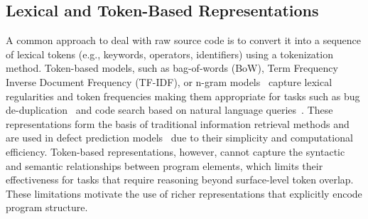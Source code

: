 \documentclass[\main/thesis.tex]{subfiles}
\begin{document}



\subsection{Lexical and Token-Based Representations}
A common approach to deal with raw source code is to convert it into a sequence of lexical tokens (e.g., keywords, operators, identifiers) using a tokenization method. Token-based models, such as bag-of-words (BoW), Term Frequency Inverse Document Frequency (TF-IDF), or n-gram models~\cite{hindle2012} capture lexical regularities and token frequencies making them appropriate for tasks such as bug de-duplication~\cite{campbell2016unreasonable} and code search based on natural language queries~\cite{lu2015query}. These representations form the basis of traditional information retrieval methods and are used in defect prediction models~\cite{yan2020JIT, pornprasit2021jitline} due to their simplicity and computational efficiency. Token-based representations, however, cannot capture the syntactic and semantic relationships between program elements, which limits their effectiveness for tasks that require reasoning beyond surface-level token overlap. These limitations motivate the use of richer representations that explicitly encode program structure.







\end{document}
